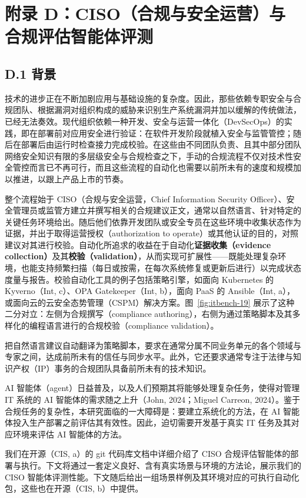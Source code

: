 \documentclass[10pt,UTF8,fontset=fandol]{ctexart}
\begin{document}
\section{附录 D：CISO（合规与安全运营）与合规评估智能体评测}

\subsection{D.1 背景}

技术的进步正在不断加剧应用与基础设施的复杂度。因此，那些依赖专职安全与合规团队、根据漏洞对组织构成的威胁来识别生产系统漏洞并加以缓解的传统做法，已经无法奏效。现代组织依赖一种开发、安全与运营一体化（DevSecOps）的实践，即在部署前对应用安全进行验证：在软件开发阶段就植入安全与监管管控；随后在部署后由运行时检查接力完成校验。在这些由不同团队负责、且其中部分团队网络安全知识有限的多层级安全与合规检查之下，手动的合规流程不仅对技术性安全管控而言已不再可行，而且这些流程的自动化也需要以前所未有的速度和规模加以推进，以跟上产品上市的节奏。

整个流程始于 CISO（合规与安全运营，Chief Information Security Officer）、安全管理员或监管方建立并撰写相关的合规建议正文，通常以自然语言、针对特定的关键任务环境给出。随后他们依靠开发团队或安全专员在这些环境中收集状态作为证据，并出于取得运营授权（authorization to operate）或其他认证的目的，对照建议对其进行校验。自动化所追求的收益在于自动化\textbf{证据收集（evidence collection）}及其\textbf{校验（validation）}，从而实现可扩展性——既能处理复杂环境，也能支持频繁扫描（每日或按需，在每次系统修复或更新后进行）以完成状态度量与报告。校验自动化工具的例子包括策略引擎，如面向 Kubernetes 的 Kyverno（Int, c）、OPA Gatekeeper（Int, b），面向 PaaS 的 Ansible（Int, a），或面向云的云安全态势管理（CSPM）解决方案。图~\ref{fig:itbench-19} 展示了这种二分对立：左侧为合规撰写（compliance authoring），右侧为通过策略脚本及其多样化的编程语言进行的合规校验（compliance validation）。

把自然语言建议自动翻译为策略脚本，要求在通常分属不同业务单元的各个领域与专家之间，达成前所未有的信任与同步水平。此外，它还要求通常专注于法律与知识产权（IP）事务的合规团队具备前所未有的技术知识。

AI 智能体（agent）日益普及，以及人们预期其将能够处理复杂任务，使得对管理 IT 系统的 AI 智能体的需求随之上升（John, 2024；Miguel Carreon, 2024）。鉴于合规任务的复杂性，本研究面临的一大障碍是：要建立系统化的方法，在 AI 智能体投入生产部署之前评估其有效性。因此，迫切需要开发基于真实 IT 任务及其对应环境来评估 AI 智能体的方法。

我们在开源（CIS, a）的 git 代码库文档中详细介绍了 CISO 合规评估智能体的部署与执行。下文将通过一套定义良好、含有真实场景与环境的方法论，展示我们的 CISO 智能体评测性能。下文随后给出一组场景样例及其环境对应的可执行自动化包，这些也在开源（CIS, b）中提供。
\end{document}
